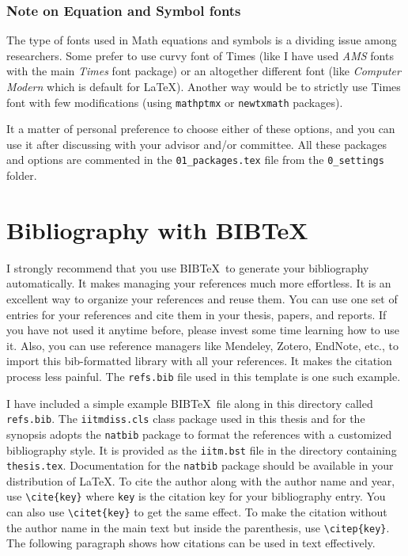 \subsubsection{Note on Equation and Symbol fonts}
The type of fonts used in Math equations and symbols is a dividing issue among researchers. Some prefer to use curvy font of Times (like I have used \textit{AMS} fonts with the main \textit{Times} font package) or an altogether different font (like \textit{Computer Modern} which is default for \LaTeX). Another way would be to strictly use Times font with few modifications (using \texttt{mathptmx} or \texttt{newtxmath} packages). 

It a matter of personal preference to choose either of these options, and you can use it after discussing with your advisor and/or committee. All these packages and options are commented in the \verb+01_packages.tex+ file from the \verb+0_settings+ folder.


\section{Bibliography with BIB\TeX}

I strongly recommend that you use BIB\TeX\ to generate your bibliography automatically.  It makes managing your references much more effortless.  It is an excellent way to organize your references and reuse them.  You can use one set of entries for your references and cite them in your thesis, papers, and reports.  If you have not used it anytime before, please invest some time learning how to use it. Also, you can use reference managers like Mendeley, Zotero, EndNote, etc., to import this bib-formatted library with all your references. It makes the citation process less painful. The \verb+refs.bib+ file used in this template is one such example.

I have included a simple example BIB\TeX\ file along in this directory called \verb+refs.bib+.  The \verb+iitmdiss.cls+ class package used in this thesis and for the synopsis adopts the \verb+natbib+ package to format the references with a customized bibliography style. It is provided as the \verb+iitm.bst+ file in the directory containing \verb+thesis.tex+.  Documentation for the \verb+natbib+ package should be available in your distribution of \LaTeX.  To cite the author along with the author name and year, use \verb+\cite{key}+ where \verb+key+ is the citation key for your bibliography entry.  You can also use \verb+\citet{key}+ to get the same effect.  To make the citation without the author name in the main text but inside the parenthesis, use \verb+\citep{key}+.  The following paragraph shows how citations can be used in text effectively.

